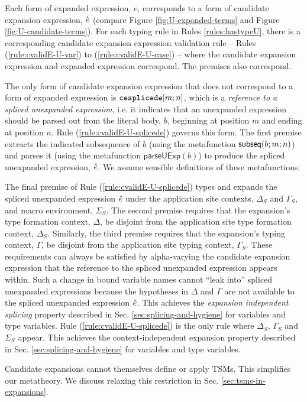 Each form of expanded expression, $e$, corresponds to a form of candidate expansion expression, $\grave{e}$ (compare Figure \ref{fig:U-expanded-terms} and Figure \ref{fig:U-candidate-terms}). For each typing rule in Rules \ref{rules:hastypeU}, there is a corresponding candidate expansion expression validation rule -- Rules (\ref{rule:cvalidE-U-var}) to (\ref{rule:cvalidE-U-case}) -- where the candidate expansion expression and expanded expression correspond. The premises also correspond.

The only form of candidate expansion expression that does not correspond to a form of expanded expression is $\texttt{cesplicede}[m; n]$, which is a \emph{reference to a spliced unexpanded expression}, i.e. it indicates that an unexpanded expression should be parsed out from the literal body, $b$, beginning at position $m$ and ending at position $n$. Rule (\ref{rule:cvalidE-U-splicede}) governs this form. The first premise extracts the indicated subsequence of $b$ (using the metafunction $\mathsf{subseq}(b; m; n)$) and parses it (using the metafunction $\mathsf{parseUExp}(b)$) to produce the spliced unexpanded expression, $\hat{e}$. We assume sensible definitions of these metafunctions.

The final premise of Rule (\ref{rule:cvalidE-U-splicede}) types and expands the spliced unexpanded expression $\hat{e}$ under the application site contexts, $\Delta_S$ and $\Gamma_S$, and macro environment, $\Sigma_S$. The second premise requires that the expansion's type formation context, $\Delta$, be disjoint from the application site type formation context, $\Delta_S$. Similarly, the third premise requires that the expansion's typing context, $\Gamma$, be disjoint from the application site typing context, $\Gamma_S$. These requirements can always be satisfied by alpha-varying the candidate expansion expression that the reference to the spliced unexpanded expression appears within. Such a change in bound variable names cannot ``leak into'' spliced unexpanded expressions because the hypotheses in $\Delta$ and $\Gamma$ are not  available to the spliced unexpanded expression $\hat{e}$. This achieves the \emph{expansion independent splicing} property described in Sec. \ref{sec:splicing-and-hygiene} for variables and type variables. Rule (\ref{rule:cvalidE-U-splicede}) is the only rule where $\Delta_S$, $\Gamma_S$ and $\Sigma_S$ appear. This achieves the context-independent expansion property described in Sec. \ref{sec:splicing-and-hygiene} for variables and type variables.

Candidate expansions cannot themselves define or apply TSMs. This simplifies our metatheory. We discuss relaxing this restriction in Sec. \ref{sec:tsms-in-expansions}.


